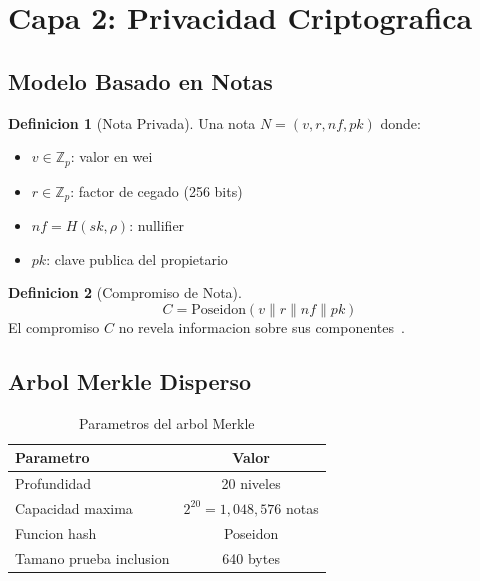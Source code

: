 \documentclass[11pt]{article}
\theoremstyle{definition}
\newtheorem{definicion}{Definicion}[section]
\theoremstyle{plain}
\theoremstyle{remark}
\begin{document}
\section{Capa 2: Privacidad Criptografica}
\label{sec:layer2}

\subsection{Modelo Basado en Notas}

\begin{definicion}[Nota Privada]
Una nota $N = (v, r, nf, pk)$ donde:
\begin{itemize}
    \item $v \in \mathbb{Z}_p$: valor en wei
    \item $r \in \mathbb{Z}_p$: factor de cegado (256 bits)
    \item $nf = H(sk, \rho)$: nullifier
    \item $pk$: clave publica del propietario
\end{itemize}
\end{definicion}

\begin{definicion}[Compromiso de Nota]
\begin{equation}
C = \text{Poseidon}(v \| r \| nf \| pk)
\end{equation}
El compromiso $C$ no revela informacion sobre sus componentes~\cite{grassi2021poseidon}.
\end{definicion}

\subsection{Arbol Merkle Disperso}

\begin{table}[H]
\centering
\caption{Parametros del arbol Merkle}
\label{tab:merkle}
\begin{tabular}{lc}
\toprule
\textbf{Parametro} & \textbf{Valor} \\
\midrule
Profundidad & 20 niveles \\
Capacidad maxima & $2^{20} = 1,048,576$ notas \\
Funcion hash & Poseidon \\
Tamano prueba inclusion & 640 bytes \\
\bottomrule
\end{tabular}
\end{table}
\end{document}
